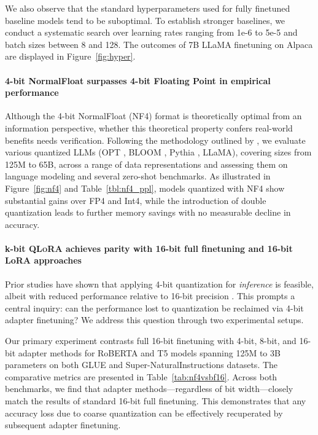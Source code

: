 We also observe that the standard hyperparameters used for fully finetuned baseline models tend to be suboptimal. To establish stronger baselines, we conduct a systematic search over learning rates ranging from 1e-6 to 5e-5 and batch sizes between 8 and 128. The outcomes of 7B LLaMA finetuning on Alpaca are displayed in Figure~\ref{fig:hyper}.

\paragraph{4-bit NormalFloat surpasses 4-bit Floating Point in empirical performance}

Although the 4-bit NormalFloat (NF4) format is theoretically optimal from an information perspective, whether this theoretical property confers real-world benefits needs verification. Following the methodology outlined by \citet{dettmers2022case}, we evaluate various quantized LLMs (OPT \citep{zhang2022opt}, BLOOM \cite{scao2022bloom}, Pythia \cite{biderman2023pythia}, LLaMA), covering sizes from 125M to 65B, across a range of data representations and assessing them on language modeling and several zero-shot benchmarks. As illustrated in Figure~\ref{fig:nf4} and Table~\ref{tbl:nf4_ppl}, models quantized with NF4 show substantial gains over FP4 and Int4, while the introduction of double quantization leads to further memory savings with no measurable decline in accuracy.

\paragraph{k-bit \textsc{QLoRA} achieves parity with 16-bit full finetuning and 16-bit LoRA approaches}

Prior studies have shown that applying 4-bit quantization for \emph{inference} is feasible, albeit with reduced performance relative to 16-bit precision \citep{dettmers2022case,frantar2022gptq}. This prompts a central inquiry: can the performance lost to quantization be reclaimed via 4-bit adapter finetuning? We address this question through two experimental setups.

Our primary experiment contrasts full 16-bit finetuning with 4-bit, 8-bit, and 16-bit adapter methods for RoBERTA and T5 models spanning 125M to 3B parameters on both GLUE and Super-NaturalInstructions datasets. The comparative metrics are presented in Table~\ref{tab:nf4vsbf16}. Across both benchmarks, we find that adapter methods—regardless of bit width—closely match the results of standard 16-bit full finetuning. This demonstrates that any accuracy loss due to coarse quantization can be effectively recuperated by subsequent adapter finetuning.

